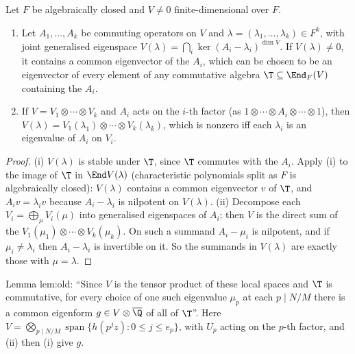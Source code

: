 \begin{lemma}\label{lem:modules:common-eigenvector}
Let $F$ be algebraically closed and $V\ne0$ finite-dimensional over $F$.
\begin{enumerate}[label=(\roman*)]
\item Let $A_1,\dots,A_k$ be commuting operators on $V$ and $\lambda=(\lambda_1,\dots,\lambda_k)\in F^k$, with joint generalised eigenspace
$V(\lambda)=\bigcap_i\ker(A_i-\lambda_i)^{\dim V}$. If $V(\lambda)\ne0$, it contains a common eigenvector of the $A_i$, which can be chosen to be an eigenvector of every
element of any commutative algebra $\T\subseteq\End_F(V)$ containing the $A_i$.
\item If $V=V_1\otimes\cdots\otimes V_k$ and $A_i$ acts on the $i$-th factor (as $1\otimes\cdots\otimes A_i\otimes\cdots\otimes1$), then $V(\lambda)=V_1(\lambda_1)\otimes\cdots\otimes V_k(\lambda_k)$, which is nonzero
iff each $\lambda_i$ is an eigenvalue of $A_i$ on $V_i$.
\end{enumerate}
\end{lemma}

\begin{proof}
(i) $V(\lambda)$ is stable under $\T$, since $\T$ commutes with the $A_i$. Apply (i) to the image of $\T$ in $\End V(\lambda)$
(characteristic polynomials split as $F$ is algebraically closed): $V(\lambda)$ contains a common eigenvector $v$ of $\T$, and $A_iv=\lambda_iv$ because $A_i-\lambda_i$ is
nilpotent on $V(\lambda)$.
(ii) Decompose each $V_i=\bigoplus_\mu V_i(\mu)$ into generalised eigenspaces of $A_i$; then $V$ is the direct sum of the $V_1(\mu_1)\otimes\cdots\otimes V_k(\mu_k)$. On such a summand
$A_i-\mu_i$ is nilpotent, and if $\mu_i\ne\lambda_i$ then $A_i-\lambda_i$ is invertible on it. So the summands in $V(\lambda)$ are exactly those with $\mu=\lambda$.
\end{proof}

\begin{paperlink}\label{pl:modules:common}
Lemma lem:old: ``Since $V$ is the tensor product of these local spaces and $\T$ is commutative, for every choice of one such eigenvalue $\mu_p$ at each $p\mid N/M$
there is a common eigenform $g\in V\otimes\overline\Q$ of all of $\T$''. Here $V=\bigotimes_{p\mid N/M}\operatorname{span}\{h(p^jz):0\le j\le e_p\}$, with $U_p$ acting on the $p$-th
factor, and (ii) then (i) give $g$.
\end{paperlink}

